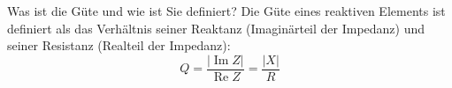 
\begin{karte}{Was ist die Güte und wie ist Sie definiert?}
	Die Güte eines reaktiven Elements ist definiert als das Verhältnis seiner Reaktanz (Imaginärteil der Impedanz) und seiner Resistanz (Realteil der Impedanz):\\
	\begin{equation*}
		Q=\frac{|\operatorname{Im} Z|}{\operatorname{Re} Z}=\frac{|X|}{R}
	\end{equation*}
\end{karte}